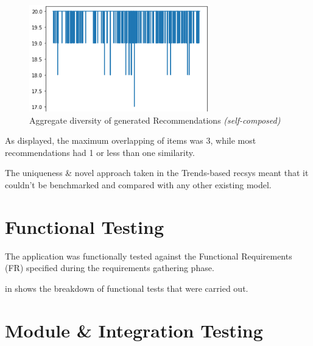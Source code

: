 \begin{figure}[h!]
\centering
\includegraphics[width=0.7\textwidth]{images/Testing/trait/aggregate diversity.png}
\caption{Aggregate diversity of generated Recommendations \textit{(self-composed)}}
\label{fig:aggregate-diversity-traits}
\end{figure}

\noindent As displayed, the maximum overlapping of items was 3, while most recommendations had 1 or less than one similarity.


The uniqueness \& novel approach taken in the Trends-based \gls{recsys} meant that it couldn't be benchmarked and compared with any other existing model.

\section{Functional Testing}
The application was functionally tested against the Functional Requirements (FR) specified during the requirements gathering phase.

\noindent\textit{} in \textbf{} shows the breakdown of functional tests that were carried out.

\section{Module \& Integration Testing}




